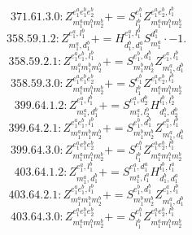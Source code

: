\documentclass[letterpaper,10pt,fleqn,leqno,onecolumn]{article}
\begin{document}
\begin{equation} \;\;\;\;\;\;  371.61.3.0: Z^{e_{1}^{a}e_{1}^{b}e_{2}^{b}}_{m_{1}^{a}m_{1}^{b}m_{2}^{b}}+=S^{e_{1}^{b}}_{l_{1}^{b}}Z^{e_{1}^{a}e_{2}^{b},l_{1}^{b}}_{m_{1}^{a}m_{1}^{b}m_{2}^{b}} \end{equation}
\begin{equation} \;\;\;\;\;\;  358.59.1.2: Z^{e_{1}^{a},l_{1}^{b}}_{m_{1}^{a},d_{1}^{b}}+=H^{e_{1}^{a},l_{1}^{b}}_{d_{1}^{b},d_{1}^{a}}S^{d_{1}^{a}}_{m_{1}^{a}}\cdot -1. \end{equation}
\begin{equation} \;\;\;\;\;\;  358.59.2.1: Z^{e_{1}^{a}e_{1}^{b},l_{1}^{b}}_{m_{1}^{a}m_{1}^{b}m_{2}^{b}}+=S^{e_{1}^{b},d_{1}^{b}}_{m_{1}^{b}m_{2}^{b}}Z^{e_{1}^{a},l_{1}^{b}}_{m_{1}^{a},d_{1}^{b}} \end{equation}
\begin{equation} \;\;\;\;\;\;  358.59.3.0: Z^{e_{1}^{a}e_{1}^{b}e_{2}^{b}}_{m_{1}^{a}m_{1}^{b}m_{2}^{b}}+=S^{e_{1}^{b}}_{l_{1}^{b}}Z^{e_{1}^{a}e_{2}^{b},l_{1}^{b}}_{m_{1}^{a}m_{1}^{b}m_{2}^{b}} \end{equation}
\begin{equation} \;\;\;\;\;\;  399.64.1.2: Z^{e_{1}^{a},l_{1}^{b}}_{m_{1}^{a},d_{1}^{b}}+=S^{e_{1}^{a},d_{2}^{b}}_{m_{1}^{a},l_{2}^{b}}H^{l_{1}^{b},l_{2}^{b}}_{d_{1}^{b},d_{2}^{b}} \end{equation}
\begin{equation} \;\;\;\;\;\;  399.64.2.1: Z^{e_{1}^{a}e_{1}^{b},l_{1}^{b}}_{m_{1}^{a}m_{1}^{b}m_{2}^{b}}+=S^{e_{1}^{b},d_{1}^{b}}_{m_{1}^{b}m_{2}^{b}}Z^{e_{1}^{a},l_{1}^{b}}_{m_{1}^{a},d_{1}^{b}} \end{equation}
\begin{equation} \;\;\;\;\;\;  399.64.3.0: Z^{e_{1}^{a}e_{1}^{b}e_{2}^{b}}_{m_{1}^{a}m_{1}^{b}m_{2}^{b}}+=S^{e_{1}^{b}}_{l_{1}^{b}}Z^{e_{1}^{a}e_{2}^{b},l_{1}^{b}}_{m_{1}^{a}m_{1}^{b}m_{2}^{b}} \end{equation}
\begin{equation} \;\;\;\;\;\;  403.64.1.2: Z^{e_{1}^{a},l_{1}^{b}}_{m_{1}^{a},d_{1}^{b}}+=S^{e_{1}^{a},d_{1}^{a}}_{m_{1}^{a},l_{1}^{a}}H^{l_{1}^{b},l_{1}^{a}}_{d_{1}^{b},d_{1}^{a}} \end{equation}
\begin{equation} \;\;\;\;\;\;  403.64.2.1: Z^{e_{1}^{a}e_{1}^{b},l_{1}^{b}}_{m_{1}^{a}m_{1}^{b}m_{2}^{b}}+=S^{e_{1}^{b},d_{1}^{b}}_{m_{1}^{b}m_{2}^{b}}Z^{e_{1}^{a},l_{1}^{b}}_{m_{1}^{a},d_{1}^{b}} \end{equation}
\begin{equation} \;\;\;\;\;\;  403.64.3.0: Z^{e_{1}^{a}e_{1}^{b}e_{2}^{b}}_{m_{1}^{a}m_{1}^{b}m_{2}^{b}}+=S^{e_{1}^{b}}_{l_{1}^{b}}Z^{e_{1}^{a}e_{2}^{b},l_{1}^{b}}_{m_{1}^{a}m_{1}^{b}m_{2}^{b}} \end{equation}
\end{document}
